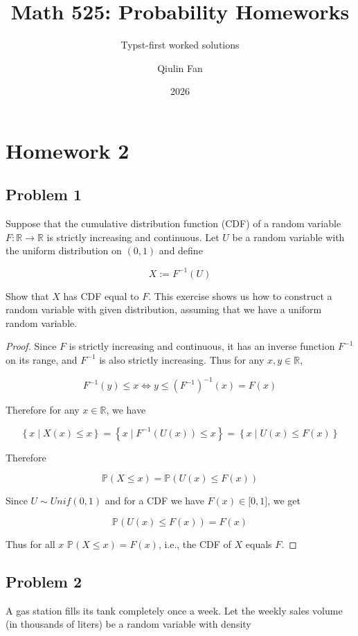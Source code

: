 \documentclass{qlnotes-export}
\title{Math 525: Probability Homeworks}
\subtitle{Typst-first worked solutions}
\author{Qiulin Fan}
\date{2026}
\begin{document}
\mainmatter
\chapter{Homework 2}\label{homework-2}

\section{Problem 1}\label{problem-1-2}

Suppose that the cumulative distribution function (CDF) of a random variable \(F:{\mathbb{R}}\rightarrow{\mathbb{R}}\) is strictly increasing and continuous. Let \(U\) be a random variable with the uniform distribution on \((0,1)\) and define

\[X := F^{- 1}(U)\]

Show that \(X\) has CDF equal to \(F\). This exercise shows us how to construct a random variable with given distribution, assuming that we have a uniform random variable.

\begin{proof}

Since \(F\) is strictly increasing and continuous, it has an inverse function \(F^{- 1}\) on its range, and \(F^{- 1}\) is also strictly increasing. Thus for any \(x,y \in {\mathbb{R}}\),

\[F^{- 1}(y) \leq x\Leftrightarrow y \leq (F^{- 1})^{- 1}(x) = F(x)\]

Therefore for any \(x \in {\mathbb{R}}\), we have

\[\left\{ {x \mid X(x) \leq x} \right\} = \left\{ {x \mid F^{- 1}(U(x)) \leq x} \right\} = \left\{ {x \mid U(x) \leq F(x)} \right\}\]

Therefore

\[{\mathbb{P}}(X \leq x) = {\mathbb{P}}(U(x) \leq F(x))\]

Since \(U \sim Unif(0,1)\) and for a CDF we have \(F(x) \in \lbrack 0,1\rbrack\), we get

\[{\mathbb{P}}(U(x) \leq F(x)) = F(x)\]

Thus for all \(x\) \({\mathbb{P}}(X \leq x) = F(x)\), i.e., the CDF of \(X\) equals \(F\).

\end{proof}

\section{Problem 2}\label{problem-2-2}

A gas station fills its tank completely once a week. Let the weekly sales volume (in thousands of liters) be a random variable with density
\end{document}
